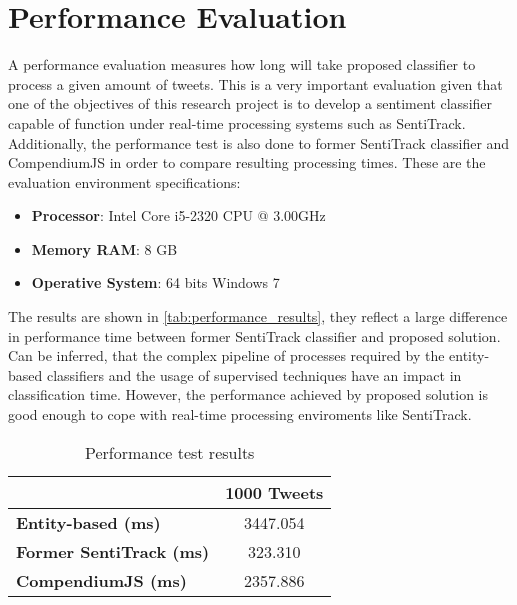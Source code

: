 \section{Performance Evaluation}

A performance evaluation measures how long will take proposed classifier to process a given amount of tweets. This is a very important evaluation given that one of the objectives of this research project is to develop a sentiment classifier capable of function under real-time processing systems such as SentiTrack. Additionally, the performance test is also done to former SentiTrack classifier and CompendiumJS in order to compare resulting processing times. These are the evaluation environment specifications: 

\begin{itemize} 
\itemsep0em  

\item \textbf{Processor}: Intel Core i5-2320 CPU @ 3.00GHz

\item \textbf{Memory RAM}: 8 GB 

\item \textbf{Operative System}: 64 bits Windows 7

\end{itemize}

The results are shown in \autoref{tab:performance_results}, they reflect a large difference in performance time between former SentiTrack classifier and proposed solution. Can be inferred, that the complex pipeline of processes required by the entity-based classifiers and the usage of supervised techniques have an impact in classification time. However, the performance achieved by proposed solution is good enough to cope with real-time processing enviroments like SentiTrack.  

\begin{table}[H]
\centering
\caption{Performance test results}
\label{tab:performance_results}
\begin{tabular}{l|c}
\multicolumn{1}{c|}{{\color[HTML]{000000} \textbf{}}} & \textbf{1000 Tweets} \\ \hline
{\color[HTML]{000000} \textbf{Entity-based (ms)}}     & 3447.054             \\ \hline
\textbf{Former SentiTrack (ms)}                       & 323.310              \\ \hline
\textbf{CompendiumJS (ms)}                            & 2357.886             \\ \hline
\end{tabular}
\end{table}

